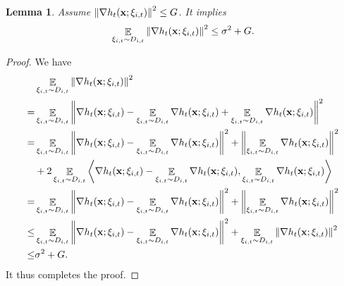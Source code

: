 \documentclass{article}
\newtheorem{Lemma}{\bf{Lemma}}
\begin{document}
\begin{Lemma}
\label{Lemma_assumption_discussion}
Assume $\left\lVert\nabla h_t({\bf x};\xi_{i,t})\right\rVert^2 \le G$. It implies
\begin{align}
\nonumber
\mathop{\mathbb{E}}_{ \xi_{i,t} \sim D_{i,t} }\left\lVert\nabla h_t({\bf x};\xi_{i,t})\right\rVert^2  \le  \sigma^2 + G.
\end{align}
\end{Lemma}
\begin{proof}
We have
\begin{align}
\nonumber
&\mathop{\mathbb{E}}_{ \xi_{i,t} \sim D_{i,t} }\left\lVert\nabla h_t({\bf x};\xi_{i,t})\right\rVert^2 \\ \nonumber 
= & \mathop{\mathbb{E}}_{ \xi_{i,t} \sim D_{i,t} }\left\lVert\nabla h_t({\bf x};\xi_{i,t}) - \mathop{\mathbb{E}}_{ \xi_{i,t} \sim D_{i,t} }\nabla h_t({\bf x};\xi_{i,t}) + \mathop{\mathbb{E}}_{ \xi_{i,t} \sim D_{i,t} }\nabla h_t({\bf x};\xi_{i,t})\right\rVert^2 \\ \nonumber
= & \mathop{\mathbb{E}}_{ \xi_{i,t} \sim D_{i,t} }\left\lVert\nabla h_t({\bf x};\xi_{i,t}) - \mathop{\mathbb{E}}_{ \xi_{i,t} \sim D_{i,t} }\nabla h_t({\bf x};\xi_{i,t})\right\rVert^2 + \left\lVert\mathop{\mathbb{E}}_{ \xi_{i,t} \sim D_{i,t} }\nabla h_t({\bf x};\xi_{i,t})\right\rVert^2 \\ \nonumber
& + 2\mathop{\mathbb{E}}_{ \xi_{i,t} \sim D_{i,t} }\left\langle\nabla h_t({\bf x};\xi_{i,t}) - \mathop{\mathbb{E}}_{ \xi_{i,t} \sim D_{i,t} }\nabla h_t({\bf x};\xi_{i,t}),\mathop{\mathbb{E}}_{ \xi_{i,t} \sim D_{i,t} }\nabla h_t({\bf x};\xi_{i,t}) \right\rangle \\ \nonumber
= & \mathop{\mathbb{E}}_{ \xi_{i,t} \sim D_{i,t} }\left\lVert\nabla h_t({\bf x};\xi_{i,t}) - \mathop{\mathbb{E}}_{ \xi_{i,t} \sim D_{i,t} }\nabla h_t({\bf x};\xi_{i,t})\right\rVert^2 + \left\lVert\mathop{\mathbb{E}}_{ \xi_{i,t} \sim D_{i,t} }\nabla h_t({\bf x};\xi_{i,t})\right\rVert^2  \\ \nonumber
\le & \mathop{\mathbb{E}}_{ \xi_{i,t} \sim D_{i,t} }\left\lVert\nabla h_t({\bf x};\xi_{i,t}) - \mathop{\mathbb{E}}_{ \xi_{i,t} \sim D_{i,t} }\nabla h_t({\bf x};\xi_{i,t})\right\rVert^2 + \mathop{\mathbb{E}}_{ \xi_{i,t} \sim D_{i,t} }\left\lVert\nabla h_t({\bf x};\xi_{i,t})\right\rVert^2  \\ \nonumber
\le & \sigma^2 + G.
\end{align} It thus completes the proof.
\end{proof}
\end{document}
